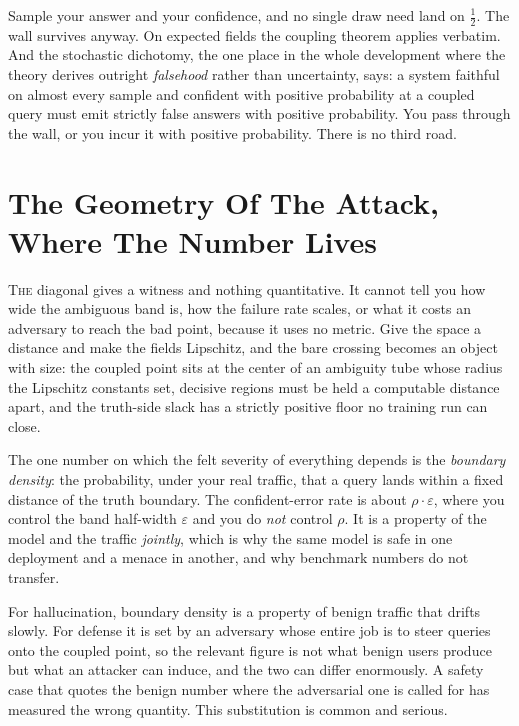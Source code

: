 \documentclass[11pt,twoside]{article}
\newcounter{verse}[section]
\newcommand{\vp}{\par\medskip\refstepcounter{verse}%
  \noindent\llap{{\bfseries\scriptsize\thesection:\theverse}\hspace*{0.9em}}}
\renewcommand{\thesection}{\arabic{section}}
\begin{document}
\begin{caution}
Sample your answer and your confidence, and no single draw need land on
$\tfrac12$. The wall survives anyway. On expected fields the coupling theorem
applies verbatim. And the stochastic dichotomy, the one place in the whole
development where the theory derives outright \emph{falsehood} rather than
uncertainty, says: a system faithful on almost every sample and confident with
positive probability at a coupled query must emit strictly false answers with
positive probability. You pass through the wall, or you incur it with positive
probability. There is no third road.
\end{caution}

\section{The Geometry Of The Attack, Where The Number Lives}

\lettrine[lines=3]{T}{he} diagonal gives a witness and nothing quantitative. It
cannot tell you how wide the ambiguous band is, how the failure rate scales, or
what it costs an adversary to reach the bad point, because it uses no metric. Give
the space a distance and make the fields Lipschitz, and the bare crossing becomes
an object with size: the coupled point sits at the center of an ambiguity tube
whose radius the Lipschitz constants set, decisive regions must be held a
computable distance apart, and the truth-side slack has a strictly positive floor
no training run can close.

\vp The one number on which the felt severity of everything depends is the
\emph{boundary density}: the probability, under your real traffic, that a query
lands within a fixed distance of the truth boundary. The confident-error rate is
about $\rho \cdot \varepsilon$, where you control the band half-width $\varepsilon$
and you do \emph{not} control $\rho$. It is a property of the model and the traffic
\emph{jointly}, which is why the same model is safe in one deployment and a menace
in another, and why benchmark numbers do not transfer.

\begin{caution}
For hallucination, boundary density is a property of benign traffic that drifts
slowly. For defense it is set by an adversary whose entire job is to steer queries
onto the coupled point, so the relevant figure is not what benign users produce
but what an attacker can induce, and the two can differ enormously. A safety case
that quotes the benign number where the adversarial one is called for has measured
the wrong quantity. This substitution is common and serious.
\end{caution}
\end{document}
